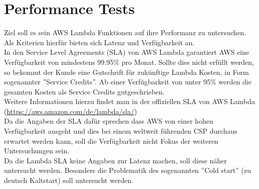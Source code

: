 \documentclass[12pt,a4paper,parskip=half]{scrreprt}
\begin{document}
\chapter{Performance Tests}

Ziel soll es sein AWS Lambda Funktionen auf ihre Performanz zu untersuchen. Als Kriterien hierfür bieten sich Latenz und Verfügbarkeit an.
\\
In den Service Level Agreements (SLA) von AWS Lambda garantiert AWS eine Verfügbarkeit von mindestens 99.95\% pro Monat. Sollte dies nicht erfüllt werden, so bekommt der Kunde eine Gutschrift für zukünftige Lambda Kosten, in Form sogenannter ''Service Credits''. Ab einer Verfügbarkeit von unter 95\% werden die gesamten Kosten als Service Credits gutgeschrieben.
\cite{Lambda-SLA}
\\
Weitere Informationen hierzu findet man in der offiziellen SLA von AWS Lambda (\url{https://aws.amazon.com/de/lambda/sla/})
\\
Da die Angaben der SLA dafür sprechen dass AWS von einer hohen Verfügbarkeit ausgeht und dies bei einem weltweit führenden CSP durchaus erwartet werden kann, soll die Verfügbarkeit nicht Fokus der weiteren Untersuchungen sein.
\\
Da die Lambda SLA keine Angaben zur Latenz machen, soll diese näher untersucht werden. Besonders die Problematik des sogenannten ''Cold start'' (zu deutsch Kaltstart) soll untersucht werden.
\end{document}
